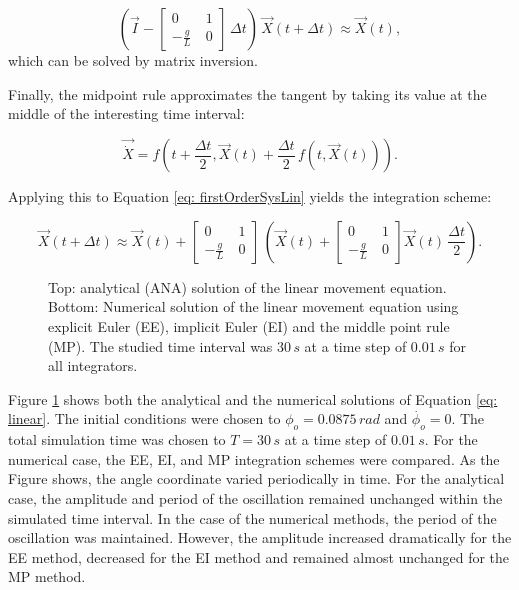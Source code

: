 \documentclass[12pt,bibstyle=none,pagenumberinfooter]{ifmdocument}
\begin{document}
\begin{equation}
    \left(\vec{I} - \begin{bmatrix}
        0 & 1 \\ -\frac{g}{L}\ & 0
    \end{bmatrix}\,\Delta t \right)\,\Vec{X}(t+\Delta t) \approx \Vec{X}(t),
\end{equation}
which can be solved by matrix inversion.

Finally, the midpoint rule approximates the tangent by taking its value at the middle of the interesting time interval:

\begin{equation}
    \Vec{\Dot{X}} = f\left( t+\frac{\Delta t}{2}, \Vec{X}(t) + \frac{\Delta t}{2}\,f\left(t, \Vec{X}(t)\right) \right).
\end{equation}

Applying this to Equation \ref{eq: firstOrderSysLin} yields the integration scheme:

\begin{equation}
    \Vec{X}(t+\Delta t) \approx \vec{X}(t) + \begin{bmatrix}
        0 & 1 \\ -\frac{g}{L}\ & 0
    \end{bmatrix}\,\left(\Vec{X}(t) + \begin{bmatrix}
            0 & 1 \\ -\frac{g}{L}\ & 0
        \end{bmatrix} \Vec{X}(t)\, \frac{\Delta t}{2} \right).
\end{equation}


\begin{figure}[h]
    \centering
    \setlength{\figH}{0.3\textheight}
    \setlength{\figW}{0.6\textwidth}
    
    \caption{Top: analytical (ANA) solution of the linear movement equation. Bottom: Numerical solution of the linear movement equation using explicit Euler (EE), implicit Euler (EI) and the middle point rule (MP). The studied time interval was $30\,s$ at a time step of $0.01\,s$ for all integrators.}
    \label{fig:LinSolutions}
\end{figure}

Figure \ref{fig:LinSolutions} shows both the analytical and the numerical solutions of Equation \ref{eq: linear}. The initial conditions were chosen to $\phi_o = 0.0875\,rad$ and $\Dot{\phi_o}= 0$. The total simulation time was chosen to $T = 30\,s$ at a time step of $0.01\,s$. For the numerical case, the EE, EI, and MP integration schemes were compared. As the Figure shows, the angle coordinate varied periodically in time. For the analytical case, the amplitude and period of the oscillation remained unchanged within the simulated time interval. In the case of the numerical methods, the period of the oscillation was maintained. However, the amplitude increased dramatically for the EE method, decreased for the EI method and remained almost unchanged for the MP method.
\end{document}

